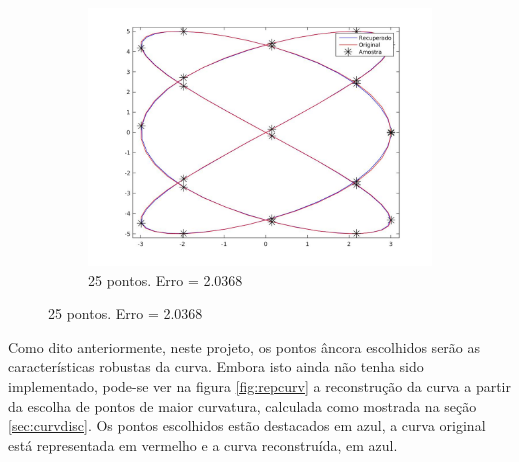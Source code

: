 \begin{figure}[ht!]
\begin{subfigure}[b]{0.31\textwidth}
	\end{subfigure}
	\hfill
	\begin{subfigure}[b]{0.31\textwidth}
		\centering
		\includegraphics[trim={5cm 2cm 3cm 2cm},clip,width=\textwidth]{img/rep_2_25.jpg}
		\caption{25 pontos. Erro = 2.0368}
		\label{fig:ex23}
	\end{subfigure} %
	\label{fig:ex2rep}
\end{figure}

Como dito anteriormente, neste projeto, os pontos âncora escolhidos serão as características robustas da curva. Embora isto ainda não tenha sido implementado, pode-se ver na figura \ref{fig:repcurv} a reconstrução da curva a partir da escolha de pontos de maior curvatura, calculada como mostrada na seção \ref{sec:curvdisc}. Os pontos escolhidos estão destacados em azul, a curva original está representada em vermelho e a curva reconstruída, em azul.

